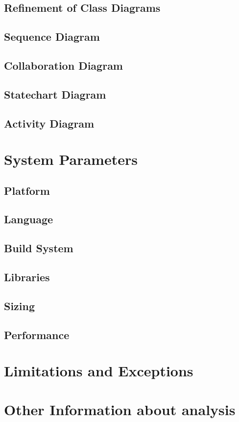 \documentclass{article}
\begin{document}
\subsection{Refinement of Class Diagrams}
\subsection{Sequence Diagram}
\subsection{Collaboration Diagram}
\subsection{Statechart Diagram}
\subsection{Activity Diagram}
\section{System Parameters}
\subsection{Platform}
\subsection{Language}
\subsection{Build System}
\subsection{Libraries}
\subsection{Sizing}
\subsection{Performance}
\section{Limitations and Exceptions}
\section{Other Information about analysis}
\end{document}
